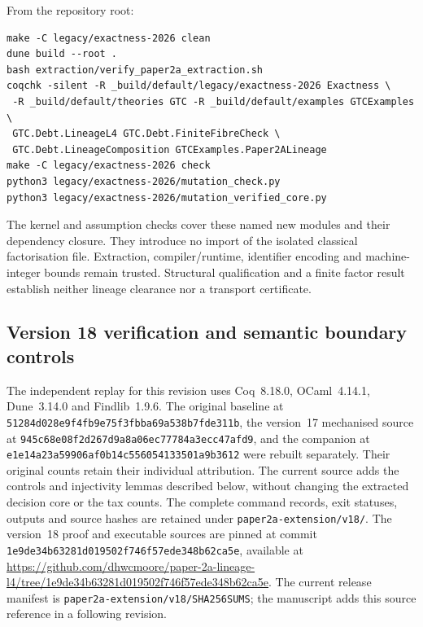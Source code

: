 \documentclass[11pt]{article}
\theoremstyle{definition}
\begin{document}
From the repository root:
\begin{verbatim}
make -C legacy/exactness-2026 clean
dune build --root .
bash extraction/verify_paper2a_extraction.sh
coqchk -silent -R _build/default/legacy/exactness-2026 Exactness \
 -R _build/default/theories GTC -R _build/default/examples GTCExamples \
 GTC.Debt.LineageL4 GTC.Debt.FiniteFibreCheck \
 GTC.Debt.LineageComposition GTCExamples.Paper2ALineage
make -C legacy/exactness-2026 check
python3 legacy/exactness-2026/mutation_check.py
python3 legacy/exactness-2026/mutation_verified_core.py
\end{verbatim}
The kernel and assumption checks cover these named new modules and their dependency closure. They introduce no import of the isolated classical factorisation file. Extraction, compiler/runtime, identifier encoding and machine-integer bounds remain trusted. Structural qualification and a finite factor result establish neither lineage clearance nor a transport certificate.

\subsection{Version 18 verification and semantic boundary controls}\label{ex:app:v18-verification}
The independent replay for this revision uses Coq~8.18.0, OCaml~4.14.1, Dune~3.14.0 and Findlib~1.9.6. The original baseline at \nolinkurl{51284d028e9f4fb9e75f3fbba69a538b7fde311b}, the version~17 mechanised source at \nolinkurl{945c68e08f2d267d9a8a06ec77784a3ecc47afd9}, and the companion at \nolinkurl{e1e14a23a59906af0b14c556054133501a9b3612} were rebuilt separately. Their original counts retain their individual attribution. The current source adds the controls and injectivity lemmas described below, without changing the extracted decision core or the tax counts. The complete command records, exit statuses, outputs and source hashes are retained under \nolinkurl{paper2a-extension/v18/}. The version~18 proof and executable sources are pinned at commit \nolinkurl{1e9de34b63281d019502f746f57ede348b62ca5e}, available at \url{https://github.com/dhwcmoore/paper-2a-lineage-l4/tree/1e9de34b63281d019502f746f57ede348b62ca5e}. The current release manifest is \nolinkurl{paper2a-extension/v18/SHA256SUMS}; the manuscript adds this source reference in a following revision.
\end{document}
